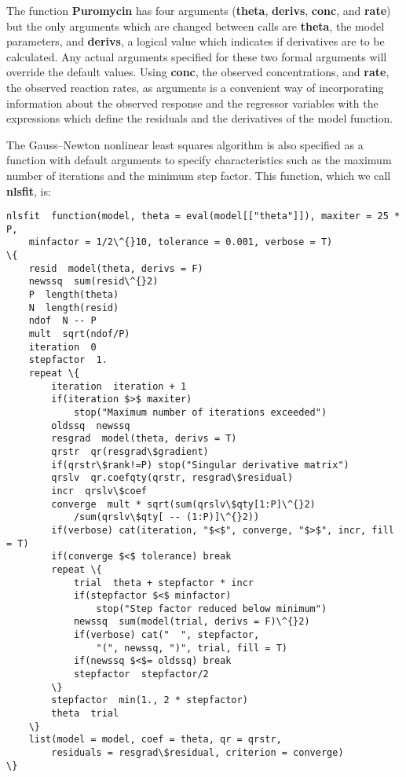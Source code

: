 The function {\bf Puromycin} has four arguments ({\bf theta},
{\bf derivs}, {\bf conc}, and {\bf rate}) but the only arguments which
are changed between calls are {\bf theta}, the model parameters, and
{\bf derivs}, a logical value which indicates if derivatives
are to be calculated.  Any actual arguments specified for these two
formal arguments will override the default values.  Using
{\bf conc}, the observed concentrations, and
{\bf rate}, the observed reaction rates, as arguments is a
convenient way of incorporating information about the observed
response and the regressor variables with the expressions which define
the residuals and the derivatives of the model function.

The Gauss--Newton nonlinear least squares algorithm is also specified
as a function with default arguments to specify characteristics such
as the maximum number of iterations and the minimum step factor.  This
function, which we call {\bf nlsfit}, is:
\begin{verbatim}
nlsfit  function(model, theta = eval(model[["theta"]]), maxiter = 25 * P,
    minfactor = 1/2\^{}10, tolerance = 0.001, verbose = T)
\{
    resid  model(theta, derivs = F)
    newssq  sum(resid\^{}2)
    P  length(theta)
    N  length(resid)
    ndof  N -- P
    mult  sqrt(ndof/P)
    iteration  0
    stepfactor  1.
    repeat \{
        iteration  iteration + 1
        if(iteration $>$ maxiter)
            stop("Maximum number of iterations exceeded")
        oldssq  newssq
        resgrad  model(theta, derivs = T)
        qrstr  qr(resgrad\$gradient)
        if(qrstr\$rank!=P) stop("Singular derivative matrix")
        qrslv  qr.coefqty(qrstr, resgrad\$residual)
        incr  qrslv\$coef
        converge  mult * sqrt(sum(qrslv\$qty[1:P]\^{}2)
            /sum(qrslv\$qty[ -- (1:P)]\^{}2))
        if(verbose) cat(iteration, "$<$", converge, "$>$", incr, fill = T)
        if(converge $<$ tolerance) break
        repeat \{
            trial  theta + stepfactor * incr
            if(stepfactor $<$ minfactor)
                stop("Step factor reduced below minimum")
            newssq  sum(model(trial, derivs = F)\^{}2)
            if(verbose) cat("  ", stepfactor,
                "(", newssq, ")", trial, fill = T)
            if(newssq $<$= oldssq) break
            stepfactor  stepfactor/2
        \}
        stepfactor  min(1., 2 * stepfactor)
        theta  trial
    \}
    list(model = model, coef = theta, qr = qrstr,
        residuals = resgrad\$residual, criterion = converge)
\}
\end{verbatim}


